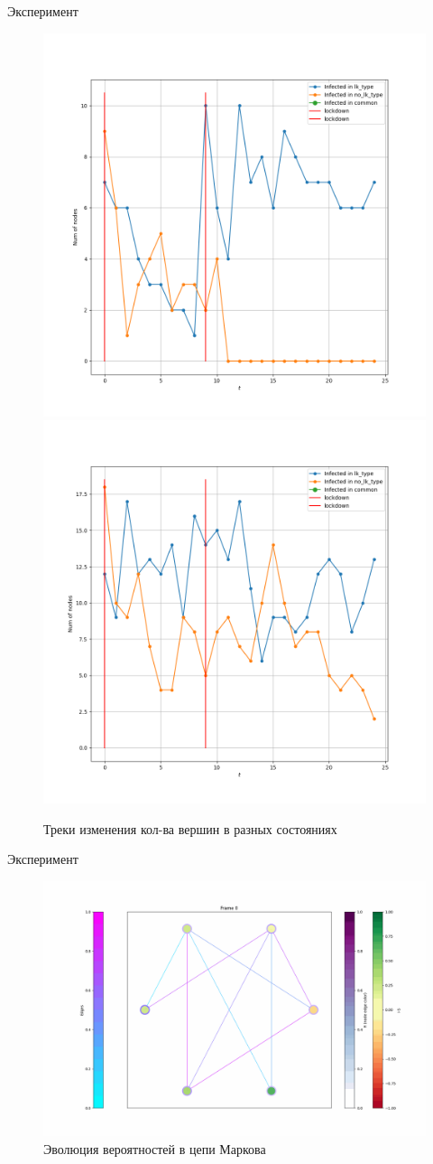 	\begin{frame}{Эксперимент}
		\begin{figure}
			\includegraphics[width=0.49\linewidth, keepaspectratio]{../../figs/evidence2/tracks.png}
			\includegraphics[width=0.49\linewidth, keepaspectratio]{../../figs/evidence3/tracks.png}
			\caption{Треки изменения кол-ва вершин в разных состояниях}
		\end{figure}
	\end{frame}

	\begin{frame}{Эксперимент}
		\begin{figure}
			\includegraphics[width=\linewidth, keepaspectratio]{./img/0.png}
			\caption{Эволюция вероятностей в цепи Маркова}
		\end{figure}
	\end{frame}


